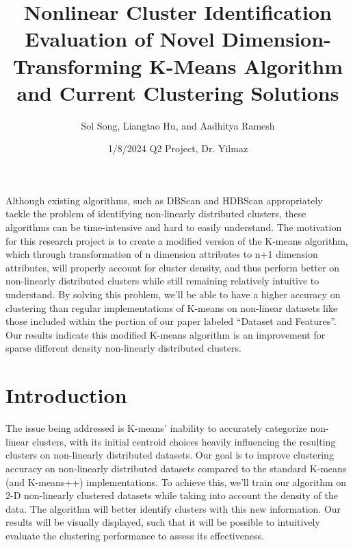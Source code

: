 \documentclass{aa}
\begin{document}
 


   \title{Nonlinear Cluster Identification Evaluation of Novel Dimension-Transforming K-Means Algorithm and Current Clustering Solutions}

   \author{Sol Song, Liangtao Hu, and Aadhitya Ramesh
          }


   \date{1/8/2024       \hspace{12cm} Q2 Project, Dr. Yilmaz
}


 
  \abstract
   {Although existing algorithms, such as DBScan and HDBScan appropriately tackle the problem of identifying non-linearly distributed clusters, these algorithms can be time-intensive and hard to easily understand. The motivation for this research project is to create a modified version of the K-means algorithm, which through transformation of n dimension attributes to n+1 dimension attributes, will properly account for cluster density, and thus perform better on non-linearly distributed clusters while still remaining relatively intuitive to understand. By solving this problem, we’ll be able to have a higher accuracy on clustering than regular implementations of K-means on non-linear datasets like those included within the portion of our paper labeled “Dataset and Features”. Our results indicate this modified K-means algorithm is an improvement for sparse different density non-linearly distributed clusters.}
 \maketitle
%
\section{Introduction}
The issue being addressed is K-means’ inability to accurately categorize non-linear clusters, with its initial centroid choices heavily influencing the resulting clusters on non-linearly distributed datasets. Our goal is to improve clustering accuracy on non-linearly distributed datasets compared to the standard K-means (and K-means++) implementations. To achieve this, we'll train our algorithm on 2-D non-linearly clustered datasets while taking into account the density of the data. The algorithm will better identify clusters with this new information. Our results will be visually displayed, such that it will be possible to intuitively evaluate the clustering performance to assess its effectiveness. 
\end{document}
